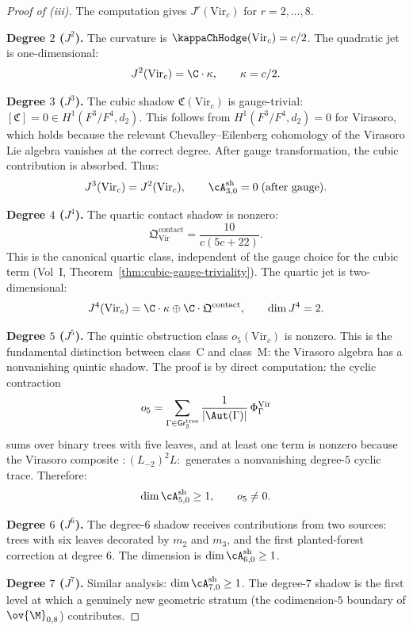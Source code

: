 \begin{proof}[Proof of {\textup{(iii)}}]
The computation gives $J^r(\mathrm{Vir}_c)$ for $r = 2, \ldots, 8$.

\medskip\noindent\textbf{Degree $2$ ($J^2$).}
The curvature is $\kappaChHodge(\mathrm{Vir}_c) = c/2$. The quadratic jet is
one-dimensional:
\[
J^2(\mathrm{Vir}_c) = \C \cdot \kappa, \qquad \kappa = c/2.
\]

\medskip\noindent\textbf{Degree $3$ ($J^3$).}
The cubic shadow $\mathfrak{C}(\mathrm{Vir}_c)$ is gauge-trivial:
$[\mathfrak{C}] = 0 \in H^1(F^3/F^4, d_2)$. This follows from
$H^1(F^3/F^4, d_2) = 0$ for Virasoro, which holds because the
relevant Chevalley--Eilenberg cohomology of the Virasoro Lie algebra
vanishes at the correct degree. After gauge transformation, the cubic
contribution is absorbed. Thus:
\[
J^3(\mathrm{Vir}_c) = J^2(\mathrm{Vir}_c), \qquad
\cA^{\mathrm{sh}}_{3,0} = 0 \;\text{(after gauge)}.
\]

\medskip\noindent\textbf{Degree $4$ ($J^4$).}
The quartic contact shadow is nonzero:
\[
\mathfrak{Q}^{\mathrm{contact}}_{\mathrm{Vir}} = \frac{10}{c(5c+22)}.
\]
This is the canonical quartic class, independent of the gauge choice for the cubic
term (Vol~I, Theorem~\ref*{thm:cubic-gauge-triviality}). The quartic jet is
two-dimensional:
\[
J^4(\mathrm{Vir}_c) = \C \cdot \kappa \oplus \C \cdot \mathfrak{Q}^{\mathrm{contact}},
\qquad \dim J^4 = 2.
\]

\medskip\noindent\textbf{Degree $5$ ($J^5$).}
The quintic obstruction class $o_5(\mathrm{Vir}_c)$ is nonzero. This is
the fundamental distinction between class~C and class~M: the Virasoro algebra
has a nonvanishing quintic shadow. The proof is by direct computation: the
cyclic contraction
\[
o_5 = \sum_{\Gamma \in \mathsf{Gr}_5^{\mathrm{tree}}}
\frac{1}{|\Aut(\Gamma)|}\,
\Phi^{\mathrm{Vir}}_\Gamma
\]
sums over binary trees with five leaves, and at least one term is nonzero because
the Virasoro composite $:(L_{-2})^2 L:$ generates a nonvanishing degree-$5$ cyclic
trace. Therefore:
\[
\dim \cA^{\mathrm{sh}}_{5,0} \geq 1, \qquad o_5 \neq 0.
\]

\medskip\noindent\textbf{Degree $6$ ($J^6$).}
The degree-$6$ shadow receives contributions from two sources: trees with six
leaves decorated by $m_2$ and $m_3$, and the first planted-forest correction at
degree $6$. The dimension is $\dim \cA^{\mathrm{sh}}_{6,0} \geq 1$.

\medskip\noindent\textbf{Degree $7$ ($J^7$).}
Similar analysis: $\dim \cA^{\mathrm{sh}}_{7,0} \geq 1$. The degree-$7$ shadow
is the first level at which a genuinely new geometric stratum (the codimension-$5$
boundary of $\ov{\M}_{0,8}$) contributes.


\end{proof}
